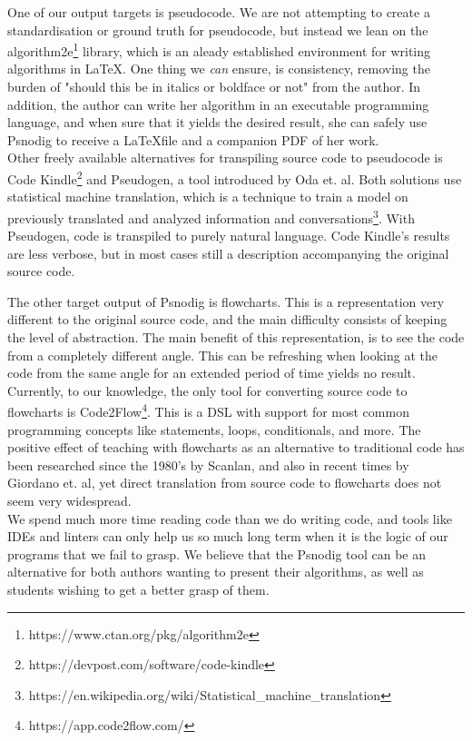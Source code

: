 One of our output targets is pseudocode. We are not attempting to create a standardisation or ground truth for pseudocode, but instead we lean on the algorithm2e\footnote{https://www.ctan.org/pkg/algorithm2e} library, which is an aleady established environment for writing algorithms in \LaTeX. One thing we \textit{can} ensure, is consistency, removing the burden of "should this be in italics or boldface or not" from the author. In addition, the author can write her algorithm in an executable programming language, and when sure that it yields the desired result, she can safely use Psnodig to receive a \LaTeX file and a companion PDF of her work. \hfill \\

Other freely available alternatives for transpiling source code to pseudocode is Code Kindle\footnote{https://devpost.com/software/code-kindle} and Pseudogen, a tool introduced by Oda et. al\cite{DBLP:conf/kbse/OdaFNHSTN15}. Both solutions use statistical machine translation, which is a technique to train a model on previously translated and analyzed information and conversations\footnote{https://en.wikipedia.org/wiki/Statistical\_machine\_translation}. With Pseudogen, code is transpiled to purely natural language. Code Kindle's results are less verbose, but in most cases still a description accompanying the original source code.

The other target output of Psnodig is flowcharts. This is a representation very different to the original source code, and the main difficulty consists of keeping the level of abstraction. The main benefit of this representation, is to see the code from a completely different angle. This can be refreshing when looking at the code from the same angle for an extended period of time yields no result. \hfill \\

Currently, to our knowledge, the only tool for converting source code to flowcharts is Code2Flow\footnote{https://app.code2flow.com/}. This is a DSL with support for most common programming concepts like statements, loops, conditionals, and more. The positive effect of teaching with flowcharts as an alternative to traditional code has been researched since the 1980's by Scanlan\cite{DBLP:journals/software/Scanlan89}, and also in recent times by Giordano et. al\cite{7096016}, yet direct translation from source code to flowcharts does not seem very widespread. \hfill \\

We spend much more time reading code than we do writing code\cite[14]{martin2008clean}, and tools like IDEs and linters can only help us so much long term when it is the logic of our programs that we fail to grasp. We believe that the Psnodig tool can be an alternative for both authors wanting to present their algorithms, as well as students wishing to get a better grasp of them. \hfill \\

